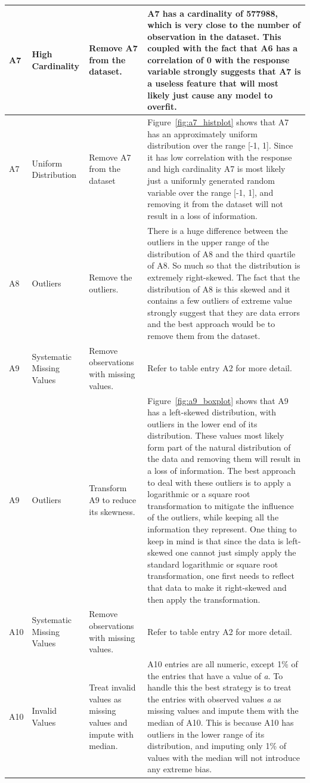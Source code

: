 \documentclass[11pt]{report}
\begin{document}
\begin{longtable}{p{2cm}p{3cm}p{4cm}p{6cm}}
\midrule
A7 & High Cardinality & Remove A7 from the dataset. & A7 has a cardinality of 577988, which is very close to the number of observation in the dataset. This coupled with the fact that A6 has a correlation of 0 with the response variable strongly suggests that A7 is a useless feature that will most likely just cause any model to overfit. \\
\midrule
A7 & Uniform Distribution & Remove A7 from the dataset & Figure~\ref{fig:a7_histplot} shows that A7 has an approximately uniform distribution over the range [-1, 1]. Since it has low correlation with the response and high cardinality A7 is most likely just a uniformly generated random variable over the range [-1, 1], and removing it from the dataset will not result in a loss of information. \\
\midrule
A8 & Outliers & Remove the outliers. & There is a huge difference between the outliers in the upper range of the distribution of A8 and the third quartile of A8. So much so that the distribution is extremely right-skewed. The fact that the distribution of A8 is this skewed and it contains a few outliers of extreme value strongly suggest that they are data errors and the best approach would be to remove them from the dataset. \\
\midrule
A9 & Systematic Missing Values & Remove observations with missing values. & Refer to table entry A2 for more detail. \\
\midrule
A9 & Outliers & Transform A9 to reduce its skewness. & Figure~\ref{fig:a9_boxplot} shows that A9 has a left-skewed distribution, with outliers in the lower end of its distribution. These values most likely form part of the natural distribution of the data and removing them will result in a loss of information. The best approach to deal with these outliers is to apply a logarithmic or a square root transformation to mitigate the influence of the outliers, while keeping all the information they represent. One thing to keep in mind is that since the data is left-skewed one cannot just simply apply the standard logarithmic or square root transformation, one first needs to reflect that data to make it right-skewed and then apply the transformation. \\
\midrule
A10 & Systematic Missing Values & Remove observations with missing values. & Refer to table entry A2 for more detail. \\
\midrule
A10 & Invalid Values & Treat invalid values as missing values and impute with median. & A10 entries are all numeric, except 1\% of the entries that have a value of \textit{a}. To handle this the best strategy is to treat the entries with observed values \textit{a} as missing values and impute them with the median of A10. This is because A10 has outliers in the lower range of its distribution, and imputing only 1\% of values with the median will not introduce any extreme bias. \\

\end{longtable}
\end{document}
